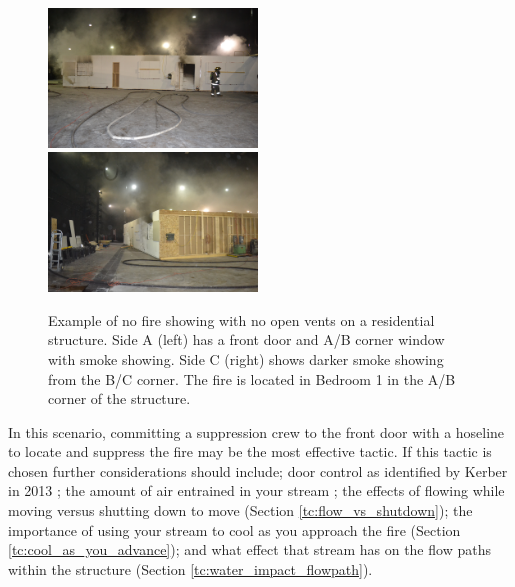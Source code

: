 \documentclass[12pt,oneside]{book}
\begin{document}
\begin{figure}[H]
\centering
\includegraphics[width=0.495\textwidth]{../0_Images/Tactical_Considerations/Interior_Attack/SIDE_A.jpg}
\includegraphics[width=0.495\textwidth]{../0_Images/Tactical_Considerations/Interior_Attack/SIDE_C.jpg}
\caption[Example - Smoke Showing - No Fire Showing]{Example of no fire showing with no open vents on a residential structure. Side A (left) has a front door and A/B corner window with smoke showing. Side C (right) shows darker smoke showing from the B/C corner. The fire is located in Bedroom 1 in the A/B corner of the structure.}
\label{fig:interior_attack_TC_smoke_showing}
\end{figure}

In this scenario, committing a suppression crew to the front door with a hoseline to locate and suppress the fire may be the most effective tactic. If this tactic is chosen further considerations should include; door control as identified by Kerber in 2013 \cite{UL_VerticalVent}; the amount of air entrained in your stream \cite{Weinchenk_airentrainment}; the effects of flowing while moving versus shutting down to move (Section \ref{tc:flow_vs_shutdown}); the importance of using your stream to cool as you approach the fire (Section \ref{tc:cool_as_you_advance}); and what effect that stream has on the flow paths within the structure (Section \ref{tc:water_impact_flowpath}).
\end{document}
